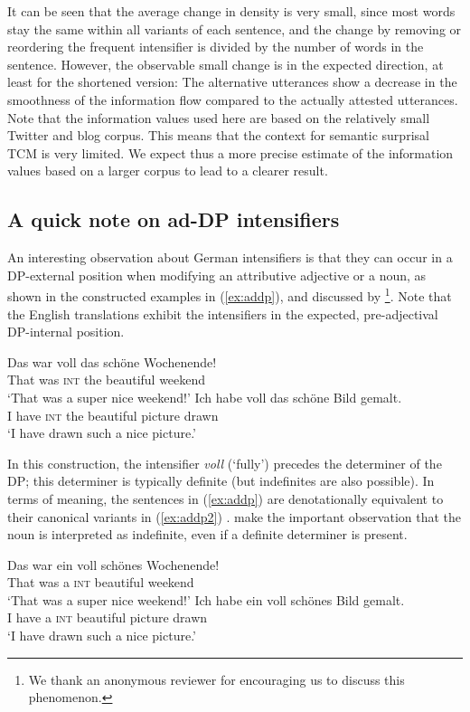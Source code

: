 \documentclass[output=paper,colorlinks,citecolor=brown]{langscibook}
\begin{document}
It can be seen that the average change in density is very small, since most words stay the same within all variants of each sentence, and the change by removing or reordering the frequent intensifier is divided by the number of words in the sentence. However, the observable small change is in the expected direction, at least for the shortened version: The alternative utterances show a  decrease in the smoothness of the information flow compared to the actually attested utterances. Note that the information values used here are based on the relatively small Twitter and blog corpus. This means that the context for semantic surprisal TCM is very limited. We expect thus a more precise estimate of the information values based on a larger corpus to lead to a clearer result.

\subsection{A quick note on ad-DP intensifiers}

An interesting observation about German intensifiers is that they can occur in a DP-external position when modifying an attributive adjective or a noun, as shown in the constructed examples in (\ref{ex:addp}), and discussed by \citet{Gutzmann2014Oct,politt2023talk}\footnote{We thank an anonymous reviewer for encouraging us to discuss this phenomenon.}. Note that the English translations exhibit the intensifiers in the expected, pre-adjectival DP-internal position.

\ea\label{ex:addp}
\ea
\gll Das war voll das schöne Wochenende!\\
That was \textsc{int} the beautiful weekend\\
\glt `That was a super nice weekend!'
\ex 
\gll Ich habe voll das schöne Bild gemalt.\\
I have \textsc{int} the beautiful picture drawn\\
\glt `I have drawn such a nice picture.'
\z
\z

In this construction, the intensifier \textit{voll} (`fully') precedes the determiner of the DP; this determiner is typically definite (but indefinites are also possible). In terms of meaning, the sentences in (\ref{ex:addp}) are denotationally equivalent to their canonical variants in (\ref{ex:addp2}) \citep{Gutzmann2014Oct}. \citet{Gutzmann2014Oct} make the important observation that the noun is interpreted as indefinite, even if a definite determiner is present.

\ea\label{ex:addp2}
\ea
\gll Das war ein voll  schönes Wochenende!\\
That was a \textsc{int}  beautiful weekend\\
\glt `That was a super nice weekend!'
\ex 
\gll Ich habe ein voll  schönes Bild gemalt.\\
I have a \textsc{int}  beautiful picture drawn\\
\glt `I have drawn such a nice picture.'
\z
\z
\end{document}
